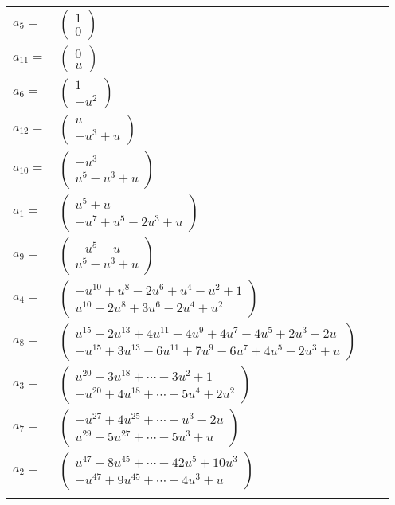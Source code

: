 \documentclass[1p]{elsarticle_modified}
\theoremstyle{definition}
\begin{document}
\begin{tabular}{m{7pt} m{180pt} m{7pt} m{180pt} }
\flushright $a_{5}=$&$\begin{pmatrix}1\\0\end{pmatrix}$ \\
\flushright $a_{11}=$&$\begin{pmatrix}0\\u\end{pmatrix}$ \\
\flushright $a_{6}=$&$\begin{pmatrix}1\\- u^2\end{pmatrix}$ \\
\flushright $a_{12}=$&$\begin{pmatrix}u\\- u^3+u\end{pmatrix}$ \\
\flushright $a_{10}=$&$\begin{pmatrix}- u^3\\u^5- u^3+u\end{pmatrix}$ \\
\flushright $a_{1}=$&$\begin{pmatrix}u^5+u\\- u^7+u^5-2 u^3+u\end{pmatrix}$ \\
\flushright $a_{9}=$&$\begin{pmatrix}- u^5- u\\u^5- u^3+u\end{pmatrix}$ \\
\flushright $a_{4}=$&$\begin{pmatrix}- u^{10}+u^8-2 u^6+u^4- u^2+1\\u^{10}-2 u^8+3 u^6-2 u^4+u^2\end{pmatrix}$ \\
\flushright $a_{8}=$&$\begin{pmatrix}u^{15}-2 u^{13}+4 u^{11}-4 u^9+4 u^7-4 u^5+2 u^3-2 u\\- u^{15}+3 u^{13}-6 u^{11}+7 u^9-6 u^7+4 u^5-2 u^3+u\end{pmatrix}$ \\
\flushright $a_{3}=$&$\begin{pmatrix}u^{20}-3 u^{18}+\cdots-3 u^2+1\\- u^{20}+4 u^{18}+\cdots-5 u^4+2 u^2\end{pmatrix}$ \\
\flushright $a_{7}=$&$\begin{pmatrix}- u^{27}+4 u^{25}+\cdots- u^3-2 u\\u^{29}-5 u^{27}+\cdots-5 u^3+u\end{pmatrix}$ \\
\flushright $a_{2}=$&$\begin{pmatrix}u^{47}-8 u^{45}+\cdots-42 u^5+10 u^3\\- u^{47}+9 u^{45}+\cdots-4 u^3+u\end{pmatrix}$\\&\end{tabular}
\end{document}
